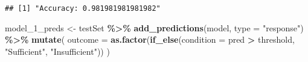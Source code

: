 \documentclass[
  11pt,
]{article}
\newenvironment{Shaded}{\begin{snugshade}}{\end{snugshade}}
\newcommand{\AttributeTok}[1]{\textcolor[rgb]{0.13,0.29,0.53}{#1}}
\newcommand{\FunctionTok}[1]{\textcolor[rgb]{0.13,0.29,0.53}{\textbf{#1}}}
\newcommand{\NormalTok}[1]{#1}
\newcommand{\OtherTok}[1]{\textcolor[rgb]{0.56,0.35,0.01}{#1}}
\newcommand{\SpecialCharTok}[1]{\textcolor[rgb]{0.81,0.36,0.00}{\textbf{#1}}}
\newcommand{\StringTok}[1]{\textcolor[rgb]{0.31,0.60,0.02}{#1}}
\begin{document}
\begin{verbatim}
## [1] "Accuracy: 0.981981981981982"
\end{verbatim}

\begin{Shaded}
\begin{Highlighting}[]
\NormalTok{model\_1\_preds }\OtherTok{\textless{}{-}}\NormalTok{ testSet }\SpecialCharTok{\%\textgreater{}\%}
  \FunctionTok{add\_predictions}\NormalTok{(model, }\AttributeTok{type =} \StringTok{"response"}\NormalTok{) }\SpecialCharTok{\%\textgreater{}\%}
  \FunctionTok{mutate}\NormalTok{(}
    \AttributeTok{outcome =} \FunctionTok{as.factor}\NormalTok{(}\FunctionTok{if\_else}\NormalTok{(}\AttributeTok{condition =}\NormalTok{ pred }\SpecialCharTok{\textgreater{}}\NormalTok{ threshold, }
                      \StringTok{"Sufficient"}\NormalTok{, }\StringTok{"Insufficient"}\NormalTok{))}
\NormalTok{  )}
\end{Highlighting}
\end{Shaded}
\end{document}
